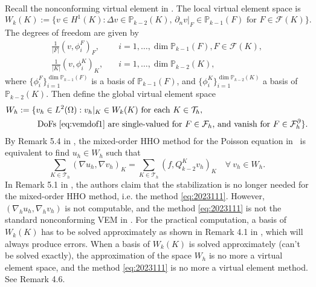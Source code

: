 \documentclass[10pt]{amsart}
\theoremstyle{definition}
\theoremstyle{remark}
\begin{document}
\begin{enumerate}[1.]
\begin{itemize}
Recall the nonconforming virtual element in \cite{AyusodeDiosLipnikovManzini2016}.
The local virtual element space is
\[
W_k(K):=\{v\in H^1(K) : \Delta v\in\mathbb P_{k-2}(K),\, \partial_nv|_F\in\mathbb P_{k-1}(F)\textrm{ for }F\in\mathcal F(K)\}.
\]
The degrees of freedom are given by
\begin{align}
\frac{1}{|F|}(v, \phi_i^F)_F, & \quad i=1,\ldots, \dim\mathbb P_{k-1}(F), F\in\mathcal F(K), \label{eq:vemdof1}\\
\frac{1}{|K|}(v, \phi_i^K)_K, & \quad i=1,\ldots, \dim\mathbb P_{k-2}(K), \label{eq:vemdof2}
\end{align}
where $\{\phi_i^F\}_{i=1}^{\dim\mathbb P_{k-1}(F)}$ is a basis of $\mathbb P_{k-1}(F)$, and $\{\phi_i^K\}_{i=1}^{\dim\mathbb P_{k-2}(K)}$ a basis of $\mathbb P_{k-2}(K)$.
Then define the global virtual element space  
\begin{align*}
W_h&:=\{v_h\in L^2(\Omega): v_h|_K\in W_k(K) \textrm{ for each } K\in\mathcal T_h, \textrm{  } \\
&\qquad\; \textrm{DoFs \eqref{eq:vemdof1} are single-valued for $F\in\mathcal F_h$, and vanish for $F\in \mathcal F_h^{\partial}$}\}.
\end{align*}
By Remark 5.4 in \cite{CicuttinErnLemaire2019}, the mixed-order HHO method for the Poisson equation in~\cite{CicuttinErnLemaire2019} is equivalent to find $u_h\in W_h$ such that
\begin{equation}\label{eq:2023111}    
\sum_{K\in\mathcal T_h}(\nabla u_h, \nabla v_h)_K=\sum_{K\in\mathcal T_h}(f, Q_{k-2}^Kv_h)_K\quad\forall~v_h\in W_h.
\end{equation}
In Remark 5.1 in \cite{CicuttinErnLemaire2019}, the authors claim that the stabilization is no longer needed for the mixed-order HHO method, i.e. the method \eqref{eq:2023111}.
However, $(\nabla_h u_h, \nabla_h v_h)$ is not computable, %
and the method \eqref{eq:2023111} is not the standard nonconforming VEM in \cite{AyusodeDiosLipnikovManzini2016}. 
For the practical computation, a basis of $W_k(K)$ has to be solved approximately as shown in 
Remark 4.1 in \cite{CicuttinErnLemaire2019}, which will always produce errors. 
When a basis of $W_k(K)$ is solved approximately (can't be solved exactly), the approximation of the space $W_h$ is no more a virtual element space, and the method \eqref{eq:2023111} is no more a virtual element method. See Remark 4.6.
\end{itemize}



\end{enumerate}
\end{document}
